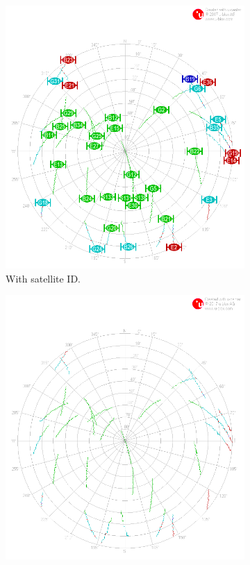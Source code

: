 \documentclass[letterpaper, 10 pt,onecolumn]{article}
\begin{document}
	\begin{figure}[b]
		\centering
		\begin{subfigure}{.45\textwidth}
			\includegraphics[width=\linewidth]{../Moving_SingleBand/skyplot.png}
			\caption{With satellite ID.}
			\label{fig:mt1_sky}
		\end{subfigure}%
		\hfill
		\begin{subfigure}{.45\textwidth}
			\includegraphics[width=\linewidth]{../Moving_SingleBand/skyplot_orbit.png}

\end{subfigure}
\end{figure}
\end{document}
